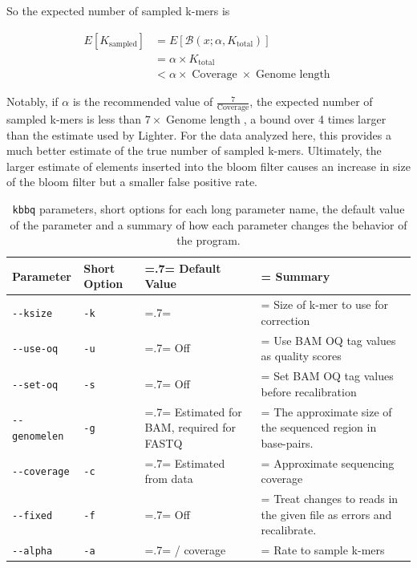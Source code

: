 \documentclass{article}
\begin{document}
\begin{outline}
	\item So the expected number of sampled k-mers is

	\begin{align}
	E[K_{\operatorname{sampled}}] &= E[\mathcal{B}(x; \alpha, K_{\operatorname{total}})] \\
	&= \alpha \times K_{\operatorname{total}} \\
	&< \alpha \times \operatorname{Coverage} \times \operatorname{Genome\:length}
	\end{align}

	\item Notably, if $\alpha$ is the recommended value of $\frac{7}{\operatorname{Coverage}}$, the expected number of sampled k-mers is less than $7 \times \operatorname{Genome\:length}$, a bound over 4 times larger than the estimate used by Lighter. For the data analyzed here, this provides a much better estimate of the true number of sampled k-mers. Ultimately, the larger estimate of elements inserted into the bloom filter causes an increase in size of the bloom filter but a smaller false positive rate.

\end{outline}

	\begin{table}
	\begin{tabularx}{\textwidth}{| l | l | >{\hsize=.7\hsize\linewidth=\hsize}X | >{\hsize=1.3\hsize\linewidth=\hsize}X | }
	\hline
	\textbf{Parameter} & \textbf{Short Option} & \textbf{Default Value} & \textbf{Summary} \\
	\hline
	\texttt{-\phantom{}-ksize} & \texttt{-k} & 32 & Size of k-mer to use for correction\\
	\texttt{-\phantom{}-use-oq} & \texttt{-u} & Off & Use BAM OQ tag values as quality scores\\
	\texttt{-\phantom{}-set-oq} & \texttt{-s} & Off & Set BAM OQ tag values before recalibration\\
	\texttt{-\phantom{}-genomelen} & \texttt{-g} & Estimated for BAM, \newline required for FASTQ & The approximate size of the sequenced region in base-pairs.\\
	\texttt{-\phantom{}-coverage} & \texttt{-c} & Estimated from data & Approximate sequencing coverage\\
	\texttt{-\phantom{}-fixed} & \texttt{-f} & Off & Treat changes to reads in the given file as errors and recalibrate. \\
	\texttt{-\phantom{}-alpha} & \texttt{-a} & 7 / coverage & Rate to sample k-mers\\
	\hline
	\end{tabularx}
	\caption{\texttt{kbbq} parameters, short options for each long parameter name, the default value of the parameter and a summary of how each parameter changes the behavior of the program.}
	\label{table:params}
	\end{table}
\end{document}
